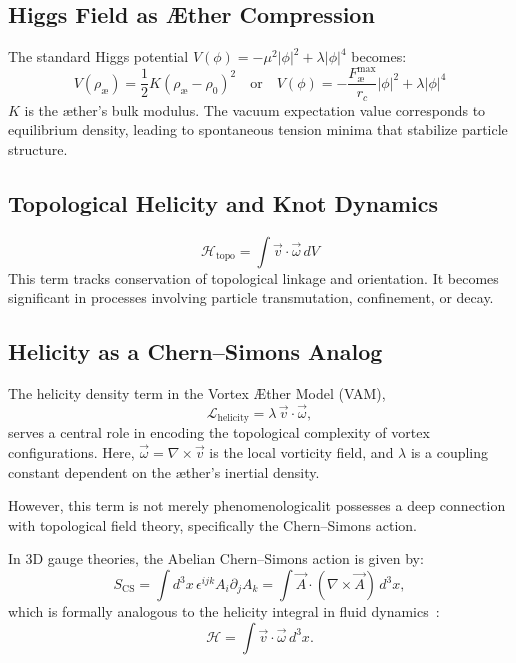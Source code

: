 \subsection{Higgs Field as \AE{}ther Compression}
The standard Higgs potential $V(\phi) = -\mu^2|\phi|^2 + \lambda|\phi|^4$ becomes:
\begin{equation}
    V(\rho_\text{\ae}) = \frac{1}{2}K(\rho_\text{\ae} - \rho_0)^2 \quad\text{or}\quad V(\phi) = -\frac{F^{\text{max}}_{\text{\ae}}}{r_c} |\phi|^2 + \lambda |\phi|^4
\end{equation}
$K$ is the \ae{}ther's bulk modulus. The vacuum expectation value corresponds to equilibrium density, leading to spontaneous tension minima that stabilize particle structure.

\subsection{Topological Helicity and Knot Dynamics}
\begin{equation}
    \mathcal{H}_\text{topo} = \int \vec{v} \cdot \vec{\omega} \, dV
\end{equation}
This term tracks conservation of topological linkage and orientation. It becomes significant in processes involving particle transmutation, confinement, or decay.

\subsection{Helicity as a Chern--Simons Analog}
The helicity density term in the Vortex \AE{}ther Model (VAM),
\begin{equation}
\mathcal{L}_{\text{helicity}} = \lambda\, \vec{v} \cdot \vec{\omega},
\end{equation}
serves a central role in encoding the topological complexity of vortex configurations. Here, $\vec{\omega} = \nabla \times \vec{v}$ is the local vorticity field, and $\lambda$ is a coupling constant dependent on the \ae{}ther's inertial density.

However, this term is not merely phenomenological\textemdash it possesses a deep connection with topological field theory, specifically the Chern--Simons action.

In 3D gauge theories, the Abelian Chern--Simons action is given by:
\begin{equation}
S_{\text{CS}} = \int d^3x\, \epsilon^{ijk} A_i \partial_j A_k = \int \vec{A} \cdot (\nabla \times \vec{A})\, d^3x,
\end{equation}
which is formally analogous to the helicity integral in fluid dynamics~\cite{moffatt1969degree, jackiw1990chern}:
\begin{equation}
\mathcal{H} = \int \vec{v} \cdot \vec{\omega}\, d^3x.
\end{equation}

